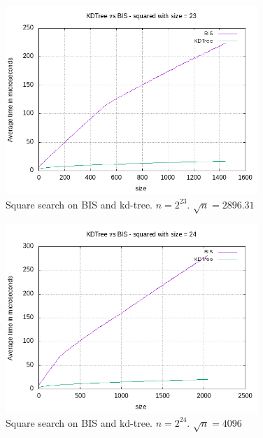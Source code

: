 \begin{figure}[h]
    \centering
    \includegraphics[width = 0.85\textwidth]{pictures/analysis/sqrt_23.png}
    \caption{Square search on BIS and kd-tree. $n=2^{23}$. $\sqrt{n} = 2896.31$}\label{fig:sqrt_23}
\end{figure}

\begin{figure}[h]
    \centering
    \includegraphics[width = 0.85\textwidth]{pictures/analysis/sqrt_24.png}
    \caption{Square search on BIS and kd-tree. $n=2^{24}$. $\sqrt{n} = 4096$}\label{fig:sqrt_24}
\end{figure}

